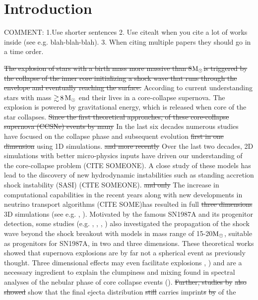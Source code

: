 \documentclass[fleqn,usenatbib]{mnras}
\newcommand{\solm}{\xspace\ensuremath{\rm{M_{\odot}}}}
\newcommand{\NY}[2]{{\color{blue}\sout{#1}#2}}
\begin{document}
\section{Introduction}
\NY{}{COMMENT: 1.Use shorter sentences 2. Use citealt when you cite a lot of works inside (see e.g. blah-blah-blah). 3. When citing multiple papers they should go in a time order.}

\NY{The explosion of stars with a birth mass more massive than 8\solm is triggered by the collapse of the inner core initializing a shock wave that runs through the envelope and eventually reaching the surface.}{ According to current understanding stars with mass $\mathord{\gtrsim}\,8\, \solm$ end their lives in a core-collapse supernova. The explosion is powered by gravitational energy, which is released when core of the star collapses.} \NY{Since the first theoretical approaches, of these core-collapse supernova (CCSNe) events by \citet{Colgate_1966} many }{ In the last six decades numerous} studies \NY{}{have} focused on the collapse \NY{}{phase} and subsequent evolution \NY{first in one dimension}{ using 1D simulations.} \NY{and more recently}{ Over the last two decades, 2D simulations with better micro-physics inputs have driven our understanding of the core-collapse problem (CITE SOMEONE). A close study of these models has lead to the discovery of new hydrodynamic instabilities such as standing accretion shock instability (SASI) (CITE SOMEONE).} \NY{and only}{ The increase in computational capabilities in the recent years along with new developments in neutrino transport algorithms (CITE SOME)has resulted} in full \NY{three dimensions}{ 3D simulations} (see e.g. \citealt{Melson2015}, \citealt{Vartanyan2018}). Motivated by the famous SN1987A and its progenitor detection, some studies (e.g. \citealt{Mueller1991}, \citealt{Kifonidis2003}, \citealt{Hammer2009}, \citealt{Wongwathanarat}) also investigated the propagation of the shock wave beyond the shock breakout with models in mass range of 15-20\solm, suitable as progenitors for SN1987A, in two and three dimensions. 
These theoretical works showed that supernova explosions are by far not a spherical event as previously thought. Three dimensional effects may even facilitate explosions \cite{Muellera}, \cite{Melson2015}) and are a necessary ingredient to explain the clumpiness and mixing found in spectral analyses of the nebular phase of core collapse events (\cite{Jerkstrand2011}). 
\NY{Further, studies by}{} \citet{Wongwathanarat_2013} \NY{also showed}{ show} that the final ejecta distribution \NY{still}{} carries imprint\NY{s}{} \NY{by}{ of} the 
\end{document}
